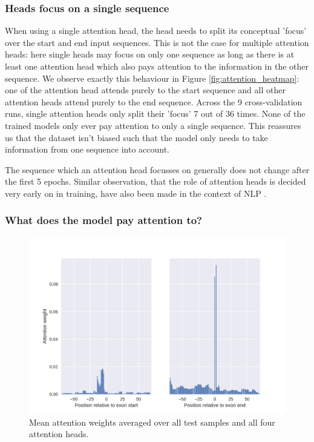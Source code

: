 \subsubsection{Heads focus on a single sequence} 
When using a single attention head, the head needs to split its conceptual 'focus' over the start and end input sequences. This is not the case for multiple attention heads: here single heads may focus on only one sequence as long as there is at least one attention head which also pays attention to the information in the other sequence. We observe exactly this behaviour in Figure \ref{fig:attention_heatmap}: one of the attention head attends purely to the start sequence and all other attention heads attend purely to the end sequence. Across the 9 cross-validation runs, single attention heads only split their 'focus' 7 out of 36 times. None of the trained models only ever pay attention to only a single sequence. This reassures us that the dataset isn't biased such that the model only needs to take information from one sequence into account. 

The sequence which an attention head focusses on generally does not change after the first 5 epochs. Similar observation, that the role of attention heads is decided very early on in training, have also been made in the context of NLP \cite{sixteenheads}.

\subsubsection{What does the model pay attention to?}

\begin{figure}
	\centering\includegraphics[width=1\textwidth]{../visualizations/ch5-results/mean_attention_barchart.png} 
	\caption{Mean attention weights averaged over all test samples and all four attention heads. }
	\label{fig:mean_attn}
\end{figure}

